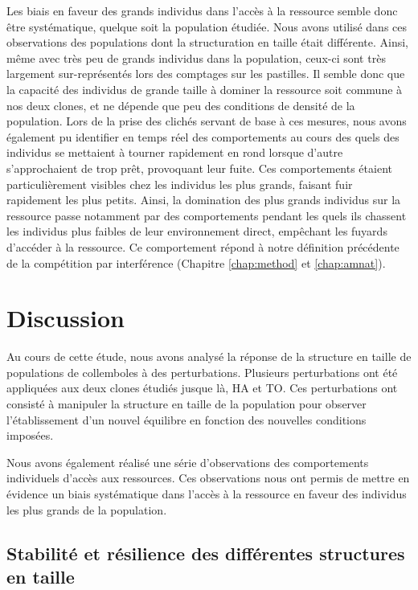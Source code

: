 Les biais en faveur des grands individus dans l'accès à la ressource semble donc
être systématique, quelque soit la population étudiée. Nous avons utilisé dans
ces observations des populations dont la structuration en taille était
différente.
Ainsi, même avec très peu de grands individus dans la population, ceux-ci sont
très largement sur-représentés lors des comptages sur les pastilles. Il semble
donc que la capacité des individus de grande taille à dominer la ressource soit
commune à nos deux clones, et ne dépende que peu des conditions de densité de la
population. Lors de la prise des clichés servant de base à ces mesures, nous
avons également pu identifier en temps réel des comportements au cours des quels
des individus se mettaient à tourner rapidement en rond lorsque d'autre
s'approchaient de trop prêt, provoquant leur fuite. Ces comportements étaient
particulièrement visibles chez les individus les plus grands, faisant fuir
rapidement les plus petits. Ainsi, la
domination des plus grands individus sur la ressource passe notamment par des
comportements pendant les quels ils chassent les individus plus faibles de leur
environnement direct, empêchant les fuyards d'accéder à la ressource. Ce
comportement répond à notre définition précédente de la compétition par
interférence (Chapitre \ref{chap:method} et \ref{chap:amnat}). 

\section{Discussion}

Au cours de cette étude, nous avons analysé la réponse de la structure en taille
de populations de collemboles à des perturbations. Plusieurs perturbations ont
été appliquées aux deux clones étudiés jusque là, HA et TO. Ces perturbations
ont consisté à manipuler la structure en taille de la population pour observer
l'établissement d'un nouvel équilibre en fonction des nouvelles conditions
imposées. 

Nous avons également réalisé une série d'observations des
comportements individuels d'accès aux ressources. Ces observations nous ont
permis de mettre en évidence un biais systématique dans l'accès à la ressource
en faveur des individus les plus grands de la population. 

\subsection{Stabilité et résilience des différentes structures en taille}

